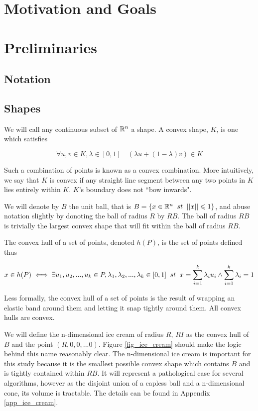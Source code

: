 \section{Motivation and Goals}

\section{Preliminaries}
\subsection{Notation}


\subsection{Shapes}

We will call any continuous subset of $\mathbb{R}^{n}$ a shape. A convex shape, $K$, is one which satisfies

$$
\forall u, v \in K, \lambda \in [0,1] \quad (\lambda u + (1-\lambda) v) \in K
$$

Such a combination of points is known as a convex combination. More intuitively, we say that $K$ is convex if any straight line segment between any two points in $K$ lies entirely within $K$. $K$'s boundary does not ``bow inwards".

We will denote by $B$ the unit ball, that is $B = \{x \in \mathbb{R}^n \;\; st \;\; ||x|| \leqslant 1\}$, and abuse notation slightly by donoting the ball of radius $R$ by $RB$. The ball of radius $RB$ is trivially the largest convex shape that will fit within the ball of radius $RB$.

The convex hull of a set of points, denoted $h(P)$, is the set of points defined thus

$$
x \in h(P) \iff \exists u_1, u_2,...,u_k \in P, \lambda_1, \lambda_2, ..., \lambda_k  \in [0,1] \;\; st \;\; x = \sum^{k}_{i=1} \lambda_i u_i \wedge \sum^{k}_{i=1} \lambda_i = 1
$$

Less formally, the convex hull of a set of points is the result of wrapping an elastic band around them and letting it snap tightly around them. All convex hulls are convex.

We will define the n-dimensional ice cream of radius $R$, $RI$ as the convex hull of $B$ and the point $(R,0,0,...0)$. Figure \ref{fig_ice_cream} should make the logic behind this name reasonably clear. The n-dimensional ice cream is important for this study because it is the smallest possible convex shape which contains $B$ and is tightly contained within $RB$. It will represent a pathological case for several algorithms, however as the disjoint union of a capless ball and a n-dimensional cone, its volume is tractable. The details can be found in Appendix \ref{app_ice_cream}.

